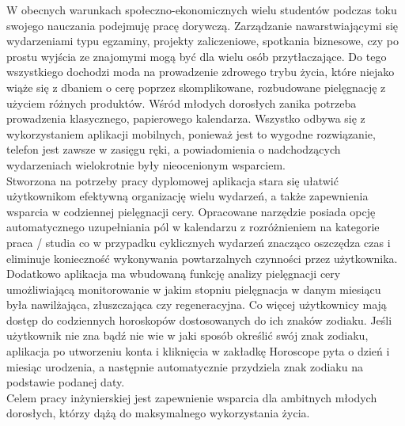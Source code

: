 \phantom{Th} 
W obecnych warunkach społeczno-ekonomicznych wielu studentów podczas toku swojego nauczania podejmuję pracę dorywczą. 
Zarządzanie nawarstwiającymi się wydarzeniami typu egzaminy, projekty zaliczeniowe, spotkania biznesowe, 
czy po prostu wyjścia ze znajomymi mogą być dla wielu osób przytłaczające. 
Do tego wszystkiego dochodzi moda na prowadzenie zdrowego trybu życia, które niejako wiąże się z dbaniem o cerę poprzez skomplikowane,
rozbudowane pielęgnację z użyciem różnych produktów. Wśród młodych dorosłych zanika potrzeba prowadzenia klasycznego, 
papierowego kalendarza. Wszystko odbywa się z wykorzystaniem aplikacji mobilnych, ponieważ jest to wygodne rozwiązanie, 
telefon jest zawsze w zasięgu ręki, a powiadomienia o nadchodzących wydarzeniach wielokrotnie były nieocenionym wsparciem.\\

Stworzona na potrzeby pracy dyplomowej aplikacja stara się ułatwić użytkownikom efektywną organizację wielu wydarzeń,
a także zapewnienia wsparcia w codziennej pielęgnacji cery. Opracowane narzędzie posiada opcję automatycznego uzupełniania pól w kalendarzu
z rozróżnieniem na kategorie praca / studia co w przypadku cyklicznych wydarzeń znacząco oszczędza czas i eliminuje konieczność 
wykonywania powtarzalnych czynności przez użytkownika. Dodatkowo aplikacja ma wbudowaną funkcję analizy pielęgnacji cery umożliwiającą
monitorowanie w jakim stopniu pielęgnacja w danym miesiącu była nawilżająca, złuszczająca czy regeneracyjna. 
Co więcej użytkownicy mają dostęp do codziennych horoskopów dostosowanych do ich znaków zodiaku. 
Jeśli użytkownik nie zna bądź nie wie w jaki sposób określić swój znak zodiaku, aplikacja po utworzeniu konta i kliknięcia w zakładkę Horoscope 
pyta o dzień i miesiąc urodzenia, a następnie automatycznie przydziela znak zodiaku na podstawie podanej daty.\\


Celem pracy inżynierskiej jest zapewnienie wsparcia dla ambitnych młodych dorosłych, którzy dążą do maksymalnego wykorzystania życia.
